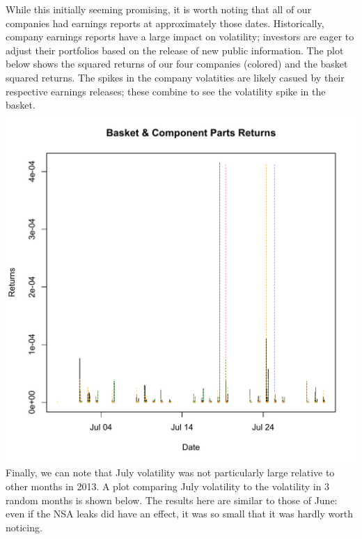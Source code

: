 \documentclass[11pt]{amsart}
\begin{document}
While this initially seeming promising, it is worth noting that all of our companies had earnings reports at approximately those dates. Historically, company earnings reports have a large impact on volatility; investors are eager to adjust their portfolios based on the release of new public information. The plot below shows the squared returns of our four companies (colored) and the basket squared returns. The spikes in the company volatities are likely casued by their respective earnings releases; these combine to see the volatility spike in the basket. \\

\includegraphics[scale=0.5]{july_earnings.pdf} \\

Finally, we can note that July volatility was not particularly large relative to other months in 2013. A plot comparing July volatility to the volatility in 3 random months is shown below. The results here are similar to those of June: even if the NSA leaks did have an effect, it was so small that it was hardly worth noticing. \\
\end{document}
